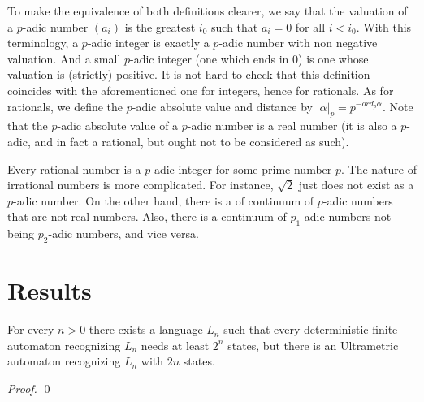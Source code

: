 \documentclass{llncs}
\begin{document}
To make the equivalence of both definitions clearer, we say that the valuation of a $p$-adic number $(a_i)$ is the greatest $i_0$ such that $a_i = 0$ for all $i < i_0$. With this terminology, a $p$-adic integer is exactly a $p$-adic number with non negative valuation. And a small $p$-adic integer (one which ends in 0) is one whose valuation is (strictly) positive. It is not hard to check that this definition coincides with the aforementioned one for integers, hence for rationals. As for rationals, we define the $p$-adic absolute value and distance by $|\alpha |_p = p^{- ord_p \alpha }$. Note that the $p$-adic absolute value of a $p$-adic number is a real number (it is also a $p$-adic, and in fact a rational, but ought not to be considered as such).

Every rational number is a $p$-adic integer for some prime number $p$. The nature of irrational numbers is more complicated. For instance, $\sqrt{2}$ just does not exist as a $p$-adic number. On the other hand, there is a of continuum of $p$-adic numbers that are not real numbers. Also, there is a continuum of $p_1$-adic numbers not being $p_2$-adic numbers, and vice versa.

\section{Results}


\begin{theorem}
For every $n>0$ there exists a language $L_n$ such that every deterministic finite automaton recognizing $L_n$ needs at least $2^n$ states, but there is an Ultrametric automaton recognizing $L_n$ with $2 n$ states.
\end{theorem}
\begin{proof}
\qed
\end{proof}

\end{document}
